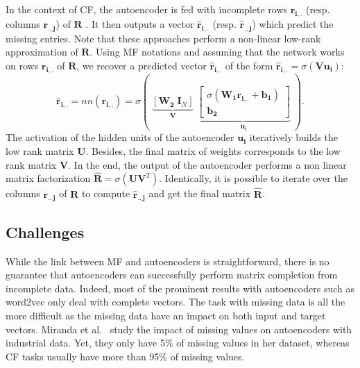 \documentclass{article}
\newcommand{\mtx}[1]{\ensuremath{\mathbf{#1}}}
\newcommand{\usparse}{\mtx{r_{i,.}}}
\newcommand{\vsparse}{\mtx{r_{.,j}}}
\newcommand{\uestim}{\mtx{\hat{r}_{i,.}}}
\newcommand{\vestim}{\mtx{\hat{r}_{.,j}}}
\begin{document}
In the context of CF, the autoencoder is fed with incomplete rows $\usparse$ (resp. columns $\vsparse$) of $\mtx{R}$ \cite{Sedhain2015,Strub2015}. It then outputs a vector $\uestim$ (resp. $\vestim$) which predict the missing entries.
Note that these approaches perform a non-linear low-rank approximation of $\mtx{R}$.
Using MF notations and assuming that the network works on rows $\usparse$ of $\mtx{R}$, we recover a predicted vector $\uestim$ of the form $\uestim=\sigma\left(\mtx{V}\mtx{u_i}\right)$:
\begin{equation*}
\uestim = nn(\usparse)
= \sigma \left(\; \underbrace{\left[\mtx{W_2} \; {\mtx{I}_N}\right]}_{\mtx{V}}\;
\underbrace{\left[\begin{array}{c}\sigma(\mtx{W_1\usparse + b_1})\\\mtx{b_2}\end{array}
\right]}_{\mtx{u_i}} \;\right).
\end{equation*}
The activation of the hidden units of the autoencoder $\mtx{u_i}$ iteratively builds the low rank matrix $\mtx{U}$. Besides, the final matrix of weights corresponds to the low rank matrix $\mtx{V}$. In the end, the output of the autoencoder performs a non linear matrix factorization $\hat{\mtx{R}} = \sigma\left(\mtx{U}\mtx{V}^T\right)$. Identically, it is possible to iterate over the columns $\vsparse$ of $\mtx{R}$ to compute $\vestim$ and get the final matrix $\hat{\mtx{R}}$. 





\subsection{Challenges}
While the link between MF and autoencoders is straightforward, there is no guarantee that autoencoders can successfully perform matrix completion from incomplete data. Indeed, most of the prominent results with autoencoders such as word2vec \cite{Mikolov2013} only deal with complete vectors. The task with missing data is all the more difficult as the missing data have an impact on both input and target vectors.
Miranda et al.~\cite{Miranda2012} study the impact of missing values on autoencoders with industrial data. Yet,
they only have 5\% of missing values in her dataset, whereas CF tasks usually have more than 95\% of missing values.
\end{document}
